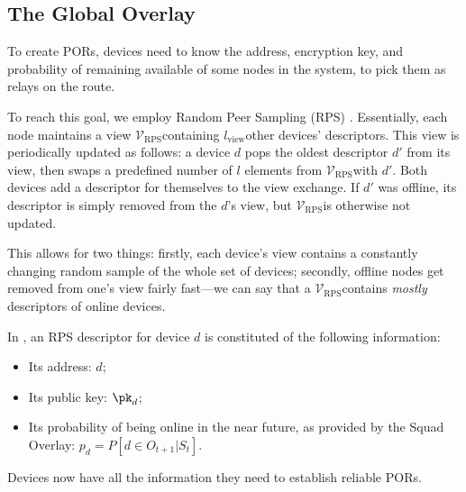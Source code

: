 \subsection{The Global Overlay}
\label{sec:global_overlay}

\newcommand{\viewsize}{\ensuremath{l_{\text{view}}\xspace}}
\newcommand{\view}{\ensuremath{\mathcal{V}_{\text{RPS}}\xspace}}
\NewAlgorithm{\GetRandomPeer}{\text{random descriptor from }\view}

To create PORs, devices need to know the address, encryption key, and probability of remaining available of some nodes in the system, to pick them as relays on the route.

To reach this goal, we employ Random Peer Sampling (RPS) \cite{Voulgaris_Gavidia_van_Steen_2005,Jelasity_Voulgaris_Guerraoui_Kermarrec_van_Steen_2007}.
Essentially, each node maintains a view \view containing \viewsize other devices' descriptors. 
This view is periodically updated as follows: a device $d$ pops the oldest descriptor $d'$ from its view, then swaps a predefined number of $l$ elements from \view with $d'$.
Both devices add a descriptor for themselves to the view exchange.
If $d'$ was offline, its descriptor is simply removed from the $d$'s view, but \view is otherwise not updated.

This allows for two things: firstly, each device's view contains a constantly changing random sample of the whole set of devices;
secondly, offline nodes get removed from one's view fairly fast---we can say that a \view contains \emph{mostly} descriptors of online devices.

In \name, an RPS descriptor for device $d$ is constituted of the following information:
\begin{itemize}
  \item Its address: $d$;
  \item Its public key: \(\pk_d\);
  \item Its probability of being online in the near future, as provided by the Squad Overlay: $p_d=P\left[d \in O_{t+1} | S_t\right]$.
\end{itemize}

Devices now have all the information they need to establish reliable PORs.




